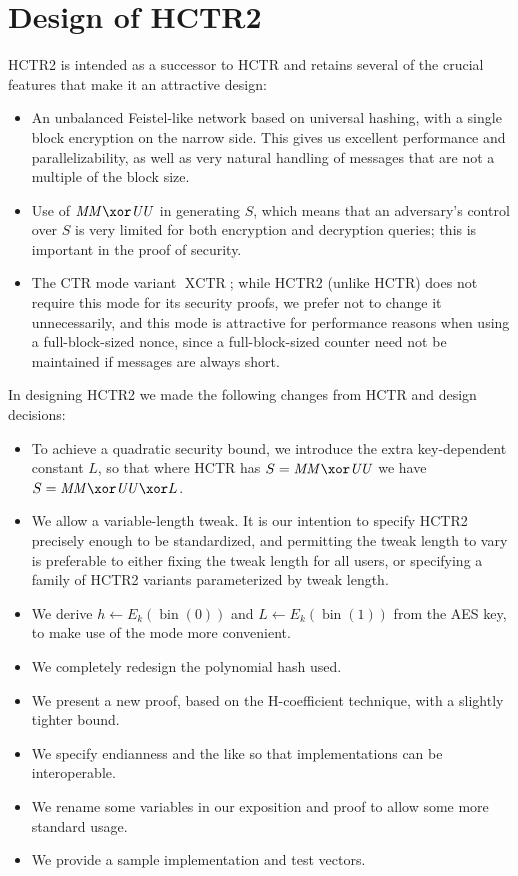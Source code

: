 \documentclass[letterpaper,11pt]{article}
\newcommand*{\MM}{\mathit{MM}}
\newcommand*{\UU}{\mathit{UU}}
\DeclareMathOperator{\fromint}{bin}
\DeclareMathOperator{\XCTR}{XCTR}
\begin{document}
\section{Design of HCTR2}
HCTR2 is intended as a successor to HCTR and retains several of the
crucial features that make it an attractive design:
\begin{itemize}
    \item An unbalanced Feistel-like network based on universal
    hashing, with a single block encryption on the narrow side.
    This gives us excellent performance and parallelizability,
    as well as very natural handling of messages that are not
    a multiple of the block size.
    \item Use of \(\MM \xor \UU\) in generating \(S\), which means
    that an adversary's control over \(S\) is very limited for both
    encryption and decryption queries; this is important in the
    proof of security.
    \item The CTR mode variant \(\XCTR\); while HCTR2 (unlike HCTR)
    does not require this mode for its security proofs, 
    we prefer not to change it unnecessarily, and this mode is
    attractive for performance reasons when using a full-block-sized
    nonce, since a full-block-sized counter need not be maintained
    if messages are always short.
\end{itemize}

In designing HCTR2 we made the following changes from HCTR and design decisions:

\begin{itemize}
    \item To achieve a quadratic security bound, we introduce the extra
    key-dependent constant \(L\),
    so that where HCTR has \(S = \MM \xor \UU\)
    we have \(S = \MM \xor \UU \xor L\).
    \item We allow a variable-length tweak. It is our intention to specify
    HCTR2 precisely enough to be standardized, and permitting the tweak length
    to vary is preferable to either fixing the tweak length for all users,
    or specifying a family of HCTR2 variants parameterized by tweak length.
    \item We derive \(h \gets E_k(\fromint(0))\)
    and \(L \gets E_k(\fromint(1))\) from the AES key, to make use of the
    mode more convenient.
    \item We completely redesign the polynomial hash used.
    \item We present a new proof, based on the H-coefficient technique, with a slightly tighter bound.
    \item We specify endianness and the like so that implementations can be interoperable.
    \item We rename some variables in our exposition and proof to allow some more standard usage.
    \item We provide a sample implementation and test vectors.
\end{itemize}
\end{document}
